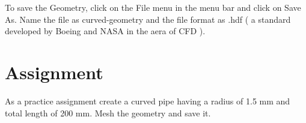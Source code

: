 \flushleft To save the Geometry, click on the File menu in the menu bar and click on Save As. Name the file as curved-geometry and the file format as .hdf ( a standard developed by Boeing and NASA in the aera of CFD ).

\section{Assignment}

As a practice assignment create a curved pipe having a radius of 1.5 mm and total length of 200 mm. Mesh the geometry and save it. 


